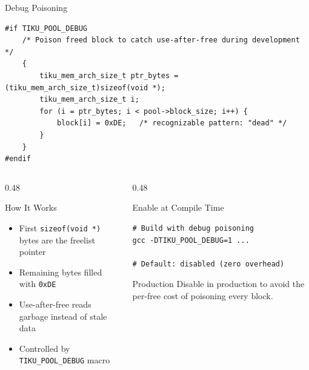 \documentclass[aspectratio=169, 10pt]{beamer}
\begin{document}
\begin{frame}[fragile]{Debug Poisoning}
\begin{lstlisting}[style=cstyle, title={kernel/memory/tiku\_pool.c --- inside tiku\_pool\_free()}]
#if TIKU_POOL_DEBUG
    /* Poison freed block to catch use-after-free during development */
    {
        tiku_mem_arch_size_t ptr_bytes = (tiku_mem_arch_size_t)sizeof(void *);
        tiku_mem_arch_size_t i;
        for (i = ptr_bytes; i < pool->block_size; i++) {
            block[i] = 0xDE;   /* recognizable pattern: "dead" */
        }
    }
#endif
\end{lstlisting}

\begin{columns}[T]
\begin{column}{0.48\textwidth}
\begin{block}{How It Works}
\begin{itemize}
  \item First \texttt{sizeof(void *)} bytes are the freelist pointer
  \item Remaining bytes filled with \texttt{0xDE}
  \item Use-after-free reads garbage instead of stale data
  \item Controlled by \texttt{TIKU\_POOL\_DEBUG} macro
\end{itemize}
\end{block}
\end{column}
\begin{column}{0.48\textwidth}
\begin{block}{Enable at Compile Time}
\begin{lstlisting}[style=bashstyle]
# Build with debug poisoning
gcc -DTIKU_POOL_DEBUG=1 ...

# Default: disabled (zero overhead)
\end{lstlisting}
\end{block}

\vspace{0.3em}
\begin{alertblock}{Production}
Disable in production to avoid the per-free cost of
poisoning every block.
\end{alertblock}
\end{column}
\end{columns}
\end{frame}

\end{document}
